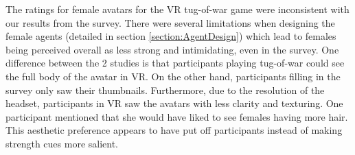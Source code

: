 The ratings for female avatars for the VR tug-of-war game were inconsistent with our results from the survey. There were several limitations when designing the female agents (detailed in section \ref{section:AgentDesign}) which lead to females being perceived overall as less strong and intimidating, even in the survey. One difference between the 2 studies is that participants playing tug-of-war could see the full body of the avatar in VR. On the other hand, participants filling in the survey only saw their thumbnails. Furthermore, due to the resolution of the headset, participants in VR saw the avatars with less clarity and texturing. One participant mentioned that she would have liked to see females having more hair. This aesthetic preference appears to have put off participants instead of making strength cues more salient.\

